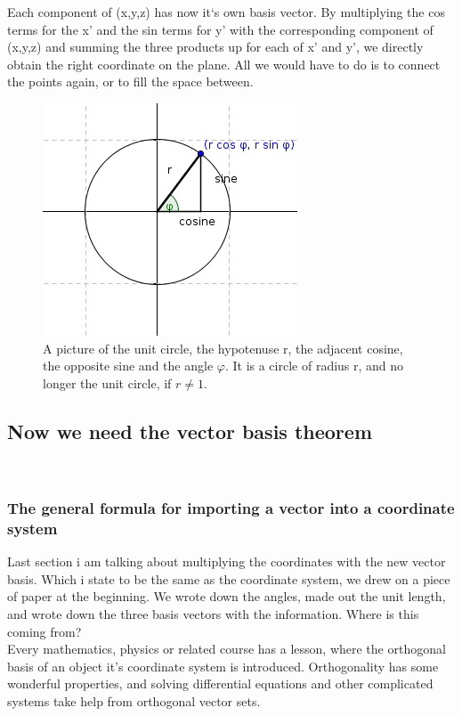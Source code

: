 \documentclass[a4paper]{article}
\begin{document}
\begin{Example}
Each component of (x,y,z) has now it`s own basis vector. By multiplying the cos terms for the x' and the sin terms for y' with the corresponding component of (x,y,z) and summing the three products up for each of x' and y', we directly obtain the right coordinate on the plane. All we would have to do is to connect the points again, or to fill the space between. \\

\begin{figure}[ht]
\includegraphics[scale=2]{unitcircle.png}
\caption{A picture of the unit circle, the hypotenuse r, the adjacent cosine, the opposite sine and the angle $\varphi$. It is a circle of radius r, and no longer the unit circle, if $r \neq 1$.}
\end{figure}



\subsection{Now we need the vector basis theorem}\\

\subsubsection{The general formula for importing a vector into a coordinate system}

Last section i am talking about multiplying the coordinates with the new vector basis. Which i state to be the same as the coordinate system, we drew on a piece of paper at the beginning. We wrote down the angles, made out the unit length, and wrote down the three basis vectors with the information. Where is this coming from?\\

Every mathematics, physics or related course has a lesson, where the orthogonal basis of an object it's coordinate system is introduced. Orthogonality has some wonderful properties, and solving differential equations and other complicated systems take help from orthogonal vector sets.\\


\end{Example}
\end{document}
